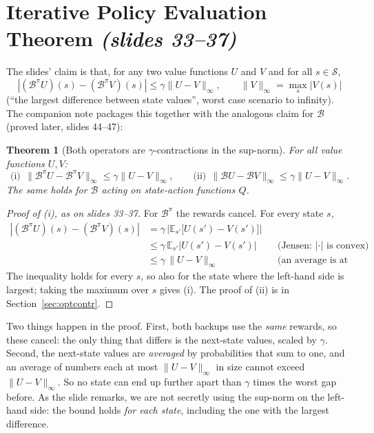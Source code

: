\documentclass[11pt,a4paper]{article}
\newcommand{\E}{\mathbb{E}}
\newcommand{\cS}{\mathcal{S}}
\newcommand{\Bell}{\mathcal{B}}
\newcommand{\Bpi}{\mathcal{B}^{\pi}}
\newcommand{\norm}[1]{\lVert #1\rVert_\infty}
\newcommand{\abs}[1]{\left\lvert #1\right\rvert}
\newcommand{\slides}[1]{\texorpdfstring{\emph{(slides #1)}}{(slides #1)}}
\newcommand{\pdfnum}[1]{\setcounter{theorem}{\numexpr #1-1\relax}}
\theoremstyle{plain}
\newtheorem{theorem}{Theorem}
\theoremstyle{definition}
\theoremstyle{remark}
\begin{document}
\section{Iterative Policy Evaluation Theorem \slides{33--37}}\label{sec:thm4}
The slides' claim is that, for any two value functions $U$ and $V$ and for all $s\in\cS$,
\[
\abs{(\Bpi U)(s)-(\Bpi V)(s)}\le\gamma\norm{U-V},\qquad\norm{V}=\max_s\abs{V(s)}
\]
(``the largest difference between state values'', worst case scenario to infinity). The companion note packages this together with the analogous claim for $\Bell$ (proved later, slides 44--47):

\pdfnum{4}
\begin{theorem}[Both operators are $\gamma$-contractions in the sup-norm]\label{thm:contraction}
For all value functions $U,V$:
\[
\text{(i)}\ \ \norm{\Bpi U-\Bpi V}\le\gamma\norm{U-V},\qquad
\text{(ii)}\ \ \norm{\Bell U-\Bell V}\le\gamma\norm{U-V}.
\]
The same holds for $\Bell$ acting on state-action functions $Q$.
\end{theorem}
\begin{proof}[Proof of (i), as on slides 33--37]
For $\Bpi$ the rewards cancel. For every state $s$,
\begin{align*}
\abs{(\Bpi U)(s)-(\Bpi V)(s)}
&=\gamma\,\Big|\E_{s'}\big[U(s')-V(s')\big]\Big|\\
&\le\gamma\,\E_{s'}\abs{U(s')-V(s')} &&\text{(Jensen: $\abs{\cdot}$ is convex)}\\
&\le\gamma\,\norm{U-V} &&\text{(an average is at most the maximum).}
\end{align*}
The inequality holds for every $s$, so also for the state where the left-hand side is largest; taking the maximum over $s$ gives (i). The proof of (ii) is in Section~\ref{sec:optcontr}.
\end{proof}

\begin{intuition}
Two things happen in the proof. First, both backups use the \emph{same} rewards, so these cancel: the only thing that differs is the next-state values, scaled by $\gamma$. Second, the next-state values are \emph{averaged} by probabilities that sum to one, and an average of numbers each at most $\norm{U-V}$ in size cannot exceed $\norm{U-V}$. So no state can end up further apart than $\gamma$ times the worst gap before. As the slide remarks, we are not secretly using the sup-norm on the left-hand side: the bound holds \emph{for each state}, including the one with the largest difference.
\end{intuition}
\end{document}
